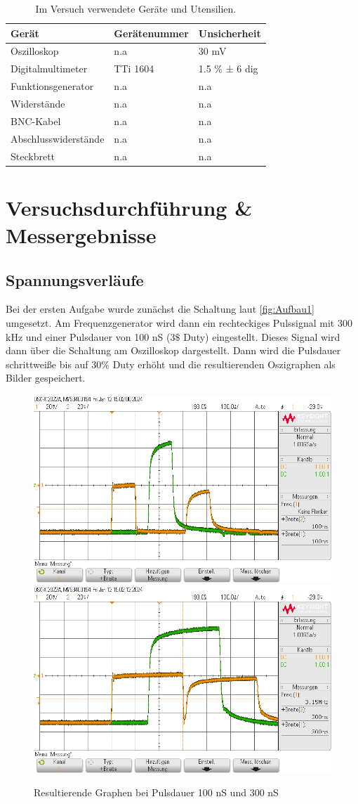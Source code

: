 \documentclass[12pt,a4paper,twoside]{article}
\begin{document}
\begin{table}[H]
    \centering
    \caption{Im Versuch verwendete Geräte und Utensilien.}
    \label{tab:geraete}
    \begin{tabular}{| l | l | l |}
        \hline
        Gerät   & Gerätenummer  & Unsicherheit \\
        \hline
        Oszilloskop & {n.a} & 30 mV \\
        Digitalmultimeter & TTi 1604 & 1.5 $\%$ ± 6 dig \\
        Funktionsgenerator & {n.a} & {n.a} \\
        Widerstände & {n.a} & {n.a} \\
        BNC-Kabel & {n.a} & {n.a} \\
        Abschlusswiderstände & {n.a} & {n.a} \\
        Steckbrett & {n.a} & {n.a} \\
        \hline
    \end{tabular}
\end{table}


\section{Versuchsdurchführung \& Messergebnisse} %

\subsection{Spannungsverläufe}

Bei der ersten Aufgabe wurde zunächst die Schaltung laut \ref{fig:Aufbau1} umgesetzt. 
Am Frequenzgenerator wird dann ein rechteckiges Pulssignal mit 300 kHz und einer Pulsdauer von 100 nS (3$\$$ Duty) eingestellt.
Dieses Signal wird dann über die Schaltung am Oszilloskop dargestellt. 
Dann wird die Pulsdauer schrittweiße bis auf 30$\%$ Duty erhöht und die resultierenden Oszigraphen als Bilder gespeichert.

\begin{figure}[H]
    \centering
    \includegraphics[width=0.4\linewidth]{nudes/Messungen/1/a/scope_1.png}
    \includegraphics[width=0.4\linewidth]{nudes/Messungen/1/a/scope_2.png}
    \caption{Resultierende Graphen bei Pulsdauer 100 nS und 300 nS}
    \label{fig:GraphenA1}
\end{figure}
\end{document}
